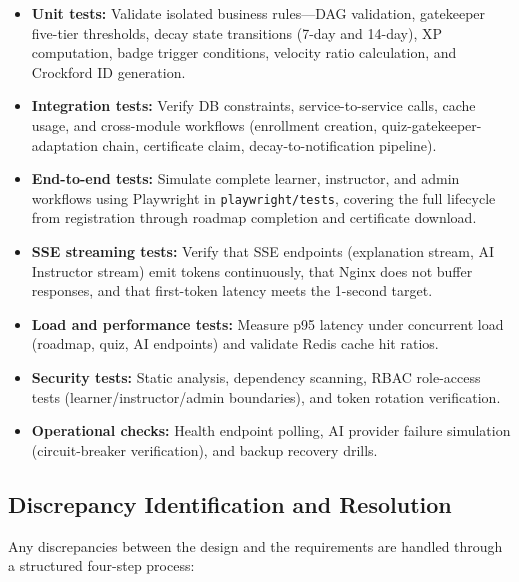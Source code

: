 \begin{itemize}
    \item \textbf{Unit tests:} Validate isolated business rules---DAG validation, gatekeeper five-tier thresholds, decay state transitions (7-day and 14-day), XP computation, badge trigger conditions, velocity ratio calculation, and Crockford ID generation.
    \item \textbf{Integration tests:} Verify DB constraints, service-to-service calls, cache usage, and cross-module workflows (enrollment creation, quiz-gatekeeper-adaptation chain, certificate claim, decay-to-notification pipeline).
    \item \textbf{End-to-end tests:} Simulate complete learner, instructor, and admin workflows using Playwright in \texttt{playwright/tests}, covering the full lifecycle from registration through roadmap completion and certificate download.
    \item \textbf{SSE streaming tests:} Verify that SSE endpoints (explanation stream, AI Instructor stream) emit tokens continuously, that Nginx does not buffer responses, and that first-token latency meets the 1-second target.
    \item \textbf{Load and performance tests:} Measure p95 latency under concurrent load (roadmap, quiz, AI endpoints) and validate Redis cache hit ratios.
    \item \textbf{Security tests:} Static analysis, dependency scanning, RBAC role-access tests (learner/instructor/admin boundaries), and token rotation verification.
    \item \textbf{Operational checks:} Health endpoint polling, AI provider failure simulation (circuit-breaker verification), and backup recovery drills.
\end{itemize}

\subsection{Discrepancy Identification and Resolution}

Any discrepancies between the design and the requirements are handled through a structured four-step process:

